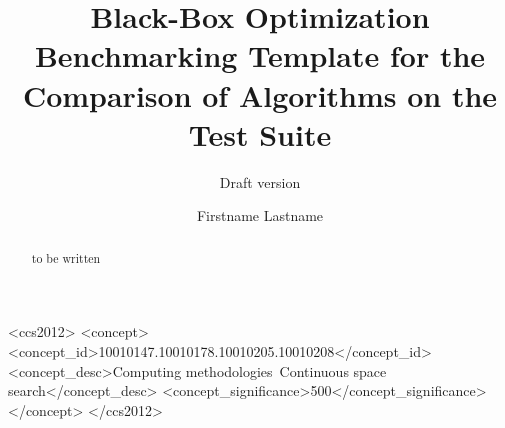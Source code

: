 \documentclass[sigconf]{acmart}
\begin{document}
\title{Black-Box Optimization Benchmarking Template for the Comparison of Algorithms on the \bbob Test Suite}

\renewcommand{\shorttitle}{Black-Box Optimization Benchmarking Template for \bbob Test Suite}
\subtitle{Draft version}


\author{Firstname Lastname}
%
%
%
%
%
%
%

\renewcommand{\shortauthors}{Firstname Lastname et. al.}


\begin{abstract}
to be written
\end{abstract}


%
%
 \begin{CCSXML}
<ccs2012>
<concept>
<concept_id>10010147.10010178.10010205.10010208</concept_id>
<concept_desc>Computing methodologies~Continuous space search</concept_desc>
<concept_significance>500</concept_significance>
</concept>
</ccs2012>
\end{CCSXML}
\end{document}
